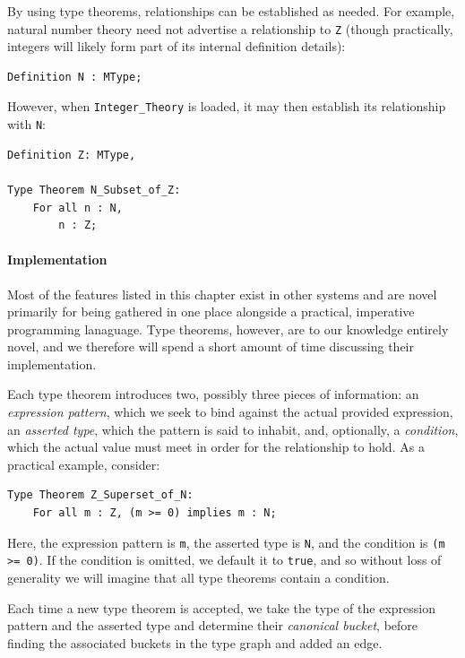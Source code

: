 By using type theorems, relationships can be established as needed.  For example, natural number theory need not advertise a relationship to \texttt{Z} (though practically, integers will likely form part of its internal definition details):

\begin{lstlisting}
Definition N : MType;
\end{lstlisting}

However, when \texttt{Integer\_Theory} is loaded, it may then establish its relationship with \texttt{N}:

\begin{lstlisting}
Definition Z: MType,

Type Theorem N_Subset_of_Z:
	For all n : N,
		n : Z;
\end{lstlisting}

\paragraph{Implementation\label{typeTheoremImplementation}}

Most of the features listed in this chapter exist in other systems and are novel primarily for being gathered in one place alongside a practical, imperative programming lanaguage.  Type theorems, however, are to our knowledge entirely novel, and we therefore will spend a short amount of time discussing their implementation.

Each type theorem introduces two, possibly three pieces of information: an \emph{expression pattern}, which we seek to bind against the actual provided expression, an \emph{asserted type}, which the pattern is said to inhabit, and, optionally, a \emph{condition}, which the actual value must meet in order for the relationship to hold.  As a practical example, consider:

\begin{lstlisting}
Type Theorem Z_Superset_of_N:
	For all m : Z, (m >= 0) implies m : N;
\end{lstlisting}

Here, the expression pattern is \texttt{m}, the asserted type is \texttt{N}, and the condition is \texttt{(m >= 0)}.  If the condition is omitted, we default it to \texttt{true}, and so without loss of generality we will imagine that all type theorems contain a condition.

Each time a new type theorem is accepted, we take the type of the expression pattern and the asserted type and determine their \emph{canonical bucket}, before finding the associated buckets in the type graph and added an edge.

